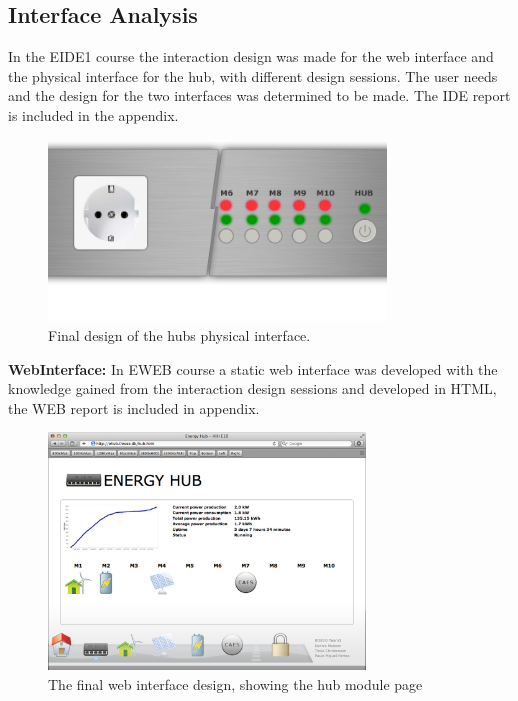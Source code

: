 \subsection{Interface Analysis}
In the EIDE1 course the interaction design was made for the web interface and the physical interface for the hub, with different design sessions. The user needs and the design for the two interfaces was determined to be made. The IDE report is included in the appendix.
\begin{figure}[H]
	\begin{centering}
		 \includegraphics[width=0.8\textwidth]{images/hub_user_interact.png}
		\caption{Final design of the hubs physical interface.}
	\end{centering}
\end{figure}
\textbf{WebInterface:} In EWEB course a static web interface was developed with the knowledge gained from the interaction design sessions and developed in HTML, the WEB report is included in appendix.
\begin{figure}[H]
	\begin{centering}
		 \includegraphics[width=0.75\textwidth]{images/screen_hub_page.png}
		\caption{The final web interface design, showing the hub module page}
 	\end{centering}
\end{figure}
